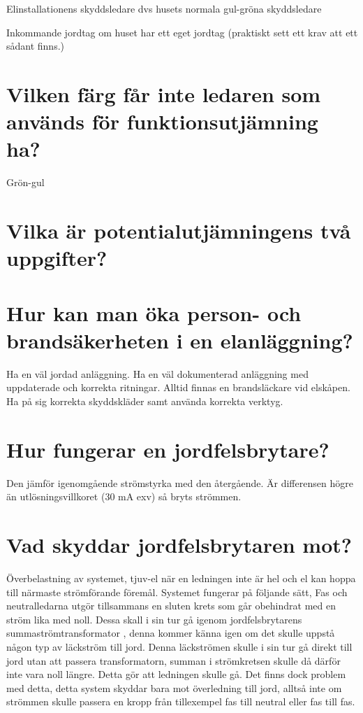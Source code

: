 \documentclass[a4paper,swedish]{article}
\begin{document}
Elinstallationens skyddsledare dvs husets normala gul-gröna skyddsledare

Inkommande jordtag om huset har ett eget jordtag (praktiskt sett ett krav att ett sådant finns.)

\section{Vilken färg får inte ledaren som används för funktionsutjämning ha?}
\label{sec:q_25}

Grön-gul

\section{Vilka är potentialutjämningens två uppgifter?}\label{sec:potentialutjamningsuppgifter}


\section{Hur kan man öka person- och brandsäkerheten i en elanläggning?}
\label{sec:q_27}

Ha en väl jordad anläggning. Ha en väl dokumenterad anläggning med uppdaterade och korrekta ritningar. Alltid finnas en brandsläckare vid elskåpen. Ha på sig korrekta skyddskläder samt använda korrekta verktyg.


\section{Hur fungerar en jordfelsbrytare?}\label{sec:RCD_working}

Den jämför igenomgående strömstyrka med den återgående. Är differensen högre än utlösningsvillkoret
(30 mA exv) så bryts strömmen.

\section{Vad skyddar jordfelsbrytaren mot?}\label{sec:q_29}

Överbelastning av systemet, tjuv-el när en ledningen inte är hel och el kan hoppa till närmaste strömförande föremål.
Systemet fungerar på följande sätt, Fas och neutralledarna utgör tillsammans en sluten krets som går obehindrat med en ström lika med noll. Dessa skall i sin tur gå igenom jordfelsbrytarens summaströmtransformator , denna kommer känna igen om det skulle uppstå någon typ av läckström till jord. Denna läckströmen skulle i sin tur gå direkt till jord utan att passera transformatorn, summan i strömkretsen skulle då därför inte vara noll längre. Detta gör att ledningen skulle gå. Det finns dock problem med detta, detta system skyddar bara mot överledning till jord, alltså inte om strömmen skulle passera en kropp från tillexempel fas till neutral eller fas till fas.
\end{document}
